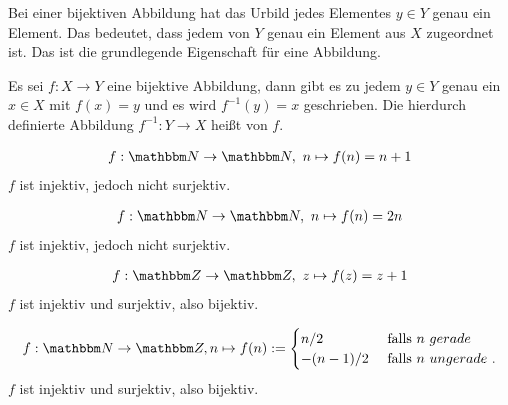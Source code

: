 \begin{Unit}
Bei einer bijektiven Abbildung hat das Urbild jedes Elementes $y \in Y$ genau 
ein Element. Das bedeutet, dass jedem von $Y$ genau ein Element aus $X$ 
zugeordnet ist. Das ist die grundlegende Eigenschaft für eine Abbildung.

\begin{Definition}
  Es sei $f : X \rightarrow Y$ eine bijektive Abbildung, dann gibt es zu jedem 
  $y \in Y$ genau ein $x \in X$ mit $f(x) = y$ und es wird $f^{-1}(y) = x$
  geschrieben. 
  Die hierdurch definierte Abbildung $f^{-1}: Y \rightarrow X$ heißt 
   von $f$.
\end{Definition}
\end{Unit} 

\begin{Unit}[Beispiel] 
  \begin{align}
    f: \NN \rightarrow \NN,\ n \mapsto f(n) = n + 1
  \end{align}
$f$ ist injektiv, jedoch nicht surjektiv.
\end{Unit}

\begin{Unit}[Beispiel] 
  \begin{align}
    f: \NN \rightarrow \NN,\ n \mapsto f(n) = 2n
  \end{align}
$f$ ist injektiv, jedoch nicht surjektiv.
\end{Unit}

\begin{Unit}[Beispiel] 
  \begin{align}
    f: \ZZ \rightarrow \ZZ,\ z \mapsto f(z) = z + 1
  \end{align}
  $f$ ist injektiv und surjektiv, also bijektiv.
\end{Unit}

\begin{Unit}[Beispiel] 
\begin{align}
  f: \NN \rightarrow \ZZ, n \mapsto f(n) := 
  \begin{cases} 
    n/2      & \text{ falls }n{\ gerade } \\ 
    -(n-1)/2 & \text{ falls }n{\ ungerade } \ .
  \end{cases}
\end{align}
$f$ ist injektiv und surjektiv, also bijektiv.
\end{Unit}


